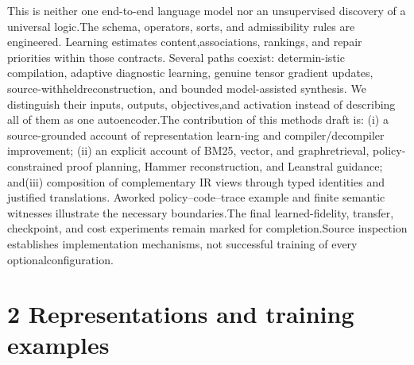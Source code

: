 \noindent
This is neither one end-to-end language model nor an unsupervised discovery of a universal logic.\linebreak[4]
The schema, operators, sorts, and admissibility rules are engineered. Learning estimates content,\linebreak[4]
associations, rankings, and repair priorities within those contracts. Several paths coexist: determin-\linebreak[4]
istic compilation, adaptive diagnostic learning, genuine tensor gradient updates, source-withheld\linebreak[4]
reconstruction, and bounded model-assisted synthesis. We distinguish their inputs, outputs, objectives,\linebreak[4]
and activation instead of describing all of them as one autoencoder.\linebreak[4]
The contribution of this methods draft is: (i) a source-grounded account of representation learn-\linebreak[4]
ing and compiler/decompiler improvement; (ii) an explicit account of BM25, vector, and graph\linebreak[4]
retrieval, policy-constrained proof planning, Hammer reconstruction, and Leanstral guidance; and\linebreak[4]
(iii) composition of complementary IR views through typed identities and justified translations. A\linebreak[4]
worked policy--code--trace example and finite semantic witnesses illustrate the necessary boundaries.\linebreak[4]
The final learned-fidelity, transfer, checkpoint, and cost experiments remain marked for completion.\linebreak[4]
Source inspection establishes implementation mechanisms, not successful training of every optional\linebreak[4]
configuration.\par

\section*{2  Representations and training examples}
